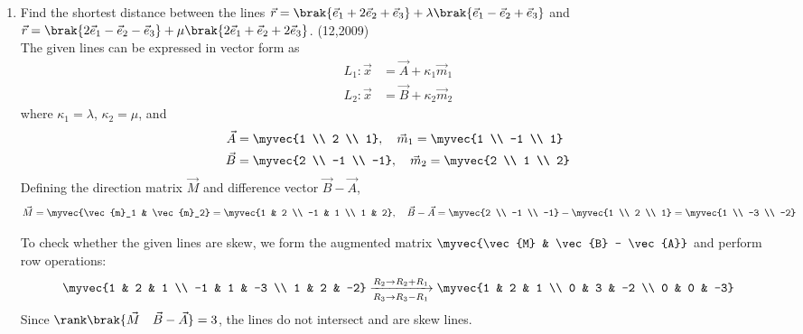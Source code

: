 \begin{enumerate}[label=\thesubsection.\arabic*, ref=\thesubsection.\theenumi]
 \item Find the shortest distance between the lines $\vec{r} = \brak{\vec{e}_1+ 2 \vec{e}_2 +  \vec{e}_3} + \lambda\brak{\vec{e}_1 -  \vec{e}_2 +  \vec{e}_3}$ and $\vec{r} = \brak{2 \vec{e}_1 -  \vec{e}_2-  \vec{e}_3} + \mu\brak{2 \vec{e}_1 +  \vec{e}_2 + 2 \vec{e}_3}$. \hfill{(12,2009)} \\
\solution
The given lines can be expressed in vector form as
\begin{align}
	L_1 : \vec{x} &= \vec{A} + \kappa_1 \vec{m}_1 \\
	L_2 : \vec{x} &= \vec{B} + \kappa_2 \vec{m}_2
\end{align}
where $\kappa_1 = \lambda$, $\kappa_2 = \mu$, and
\begin{align}
	\vec{A} &= \myvec{1 \\ 2 \\ 1}, \quad \vec{m}_1 = \myvec{1 \\ -1 \\ 1} \\
	\vec{B} &= \myvec{2 \\ -1 \\ -1}, \quad \vec{m}_2 = \myvec{2 \\ 1 \\ 2}
\end{align}
Defining the direction matrix $\vec{M}$ and difference vector $\vec{B} - \vec{A}$,
\begin{align}
	\vec{M} = \myvec{\vec{m}_1 & \vec{m}_2} = \myvec{1 & 2 \\ -1 & 1 \\ 1 & 2}, \quad
	\vec{B} - \vec{A} = \myvec{2 \\ -1 \\ -1} - \myvec{1 \\ 2 \\ 1} = \myvec{1 \\ -3 \\ -2}
\end{align}

To check whether the given lines are skew, we form the augmented matrix $\myvec{\vec{M} & \vec{B} - \vec{A}}$ and perform row operations:
\begin{align}
	\myvec{1 & 2 & 1 \\ -1 & 1 & -3 \\ 1 & 2 & -2}
	\xrightarrow[R_3 \to R_3 - R_1]{R_2 \to R_2 + R_1 }
	\myvec{1 & 2 & 1 \\ 0 & 3 & -2 \\ 0 & 0 & -3}
\end{align}
Since $\rank\brak{\vec{M} \quad \vec{B} - \vec{A}} = 3$, the lines do not intersect and are skew lines.


\end{enumerate}
